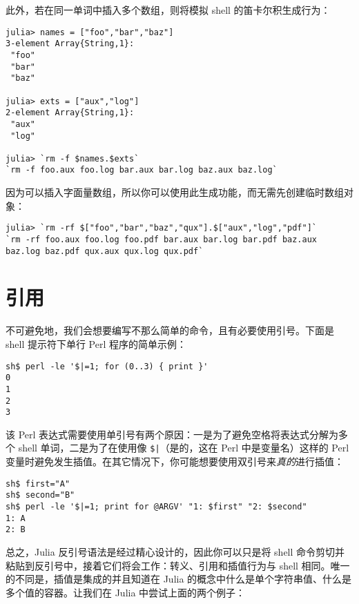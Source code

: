 此外，若在同一单词中插入多个数组，则将模拟 shell 的笛卡尔积生成行为：




\begin{verbatim}
julia> names = ["foo","bar","baz"]
3-element Array{String,1}:
 "foo"
 "bar"
 "baz"

julia> exts = ["aux","log"]
2-element Array{String,1}:
 "aux"
 "log"

julia> `rm -f $names.$exts`
`rm -f foo.aux foo.log bar.aux bar.log baz.aux baz.log`
\end{verbatim}



因为可以插入字面量数组，所以你可以使用此生成功能，而无需先创建临时数组对象：




\begin{verbatim}
julia> `rm -rf $["foo","bar","baz","qux"].$["aux","log","pdf"]`
`rm -rf foo.aux foo.log foo.pdf bar.aux bar.log bar.pdf baz.aux baz.log baz.pdf qux.aux qux.log qux.pdf`
\end{verbatim}



\hypertarget{12430289445905702597}{}


\section{引用}



不可避免地，我们会想要编写不那么简单的命令，且有必要使用引号。下面是 shell 提示符下单行 Perl 程序的简单示例：




\begin{lstlisting}
sh$ perl -le '$|=1; for (0..3) { print }'
0
1
2
3
\end{lstlisting}



该 Perl 表达式需要使用单引号有两个原因：一是为了避免空格将表达式分解为多个 shell 单词，二是为了在使用像 \texttt{\$|}（是的，这在 Perl 中是变量名）这样的 Perl 变量时避免发生插值。在其它情况下，你可能想要使用双引号来\emph{真的}进行插值：




\begin{lstlisting}
sh$ first="A"
sh$ second="B"
sh$ perl -le '$|=1; print for @ARGV' "1: $first" "2: $second"
1: A
2: B
\end{lstlisting}



总之，Julia 反引号语法是经过精心设计的，因此你可以只是将 shell 命令剪切并粘贴到反引号中，接着它们将会工作：转义、引用和插值行为与 shell 相同。唯一的不同是，插值是集成的并且知道在 Julia 的概念中什么是单个字符串值、什么是多个值的容器。让我们在 Julia 中尝试上面的两个例子：





